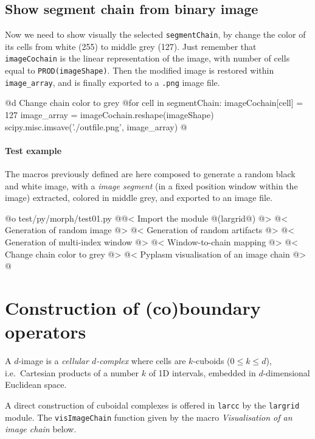 \documentclass[11pt,oneside]{article}	%
\begin{document}
\subsection{Show segment chain from binary image}

Now we need to show visually the selected \texttt{segmentChain}, by change the color of its cells from white (255) to middle grey (127). Just remember that \texttt{imageCochain} is the linear representation of the image, with number of cells equal to \texttt{PROD(imageShape)}. Then the modified image is restored within \texttt{image\_array}, and is finally exported to a \texttt{.png} image file.

@d Change chain color to grey
@{for cell in segmentChain: imageCochain[cell] = 127
image_array = imageCochain.reshape(imageShape)
scipy.misc.imsave('./outfile.png', image_array)
@}


\paragraph{Test example}

The macros previously defined are here composed to generate a random black and white image, with a \emph{image segment} (in a fixed position window within the image) extracted, colored in middle grey, and exported to an image file.  

@o test/py/morph/test01.py
@{@< Import the module @(largrid@) @>
@< Generation of random image @>
@< Generation of random artifacts @>
@< Generation of multi-index window @>
@< Window-to-chain mapping @>
@< Change chain color to grey @>
@< Pyplasm visualisation of an image chain @>
@}

\section{Construction of (co)boundary operators}

A $d$-image is a \emph{cellular $d$-complex} where cells are $k$-cuboids ($0\leq k\leq d$), i.e.~Cartesian products of a number $k$ of 1D intervals, embedded in $d$-dimensional Euclidean space. 

A direct construction of cuboidal complexes is offered in \texttt{larcc} by the \texttt{largrid} module. 
The \texttt{visImageChain} function given by the macro \emph{Visualisation of an image chain} below. 
\end{document}

